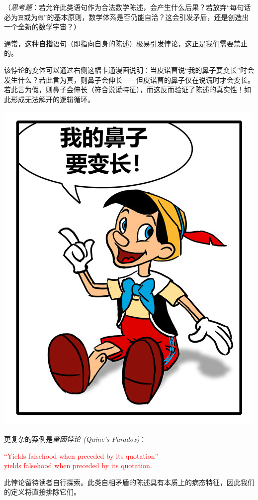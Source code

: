 （\emph{思考题}：若允许此类语句作为合法数学陈述，会产生什么后果？若放弃``每句话必为\verb|真|或为\verb|假|''的基本原则，数学体系是否仍能自洽？这会引发矛盾，还是创造出一个全新的数学宇宙？）

通常，这种\textbf{自指}语句（即指向自身的陈述）极易引发悖论，这正是我们需要禁止的。

\begin{multicols}{2}
    该悖论的变体可以通过右侧这幅卡通漫画说明：当皮诺曹说``我的鼻子要变长''时会发生什么？若此言为真，则鼻子会伸长——但皮诺曹的鼻子仅在说谎时才会变长。若此言为假，则鼻子会伸长（符合说谎特征），而这反而验证了陈述的真实性！如此形成无法解开的逻辑循环。

    \includegraphics[scale=0.3]{figure/pinocchio.png}
\end{multicols}

更复杂的案例是\emph{奎因悖论 (Quine's Paradox)}：
\begin{center}
    \textcolor{red}{``Yields falsehood when preceded by its quotation'' \\yields falsehood when preceded by its quotation.}
\end{center}
此悖论留待读者自行探索。此类自相矛盾的陈述具有本质上的病态特征，因此我们的定义将直接排除它们。
